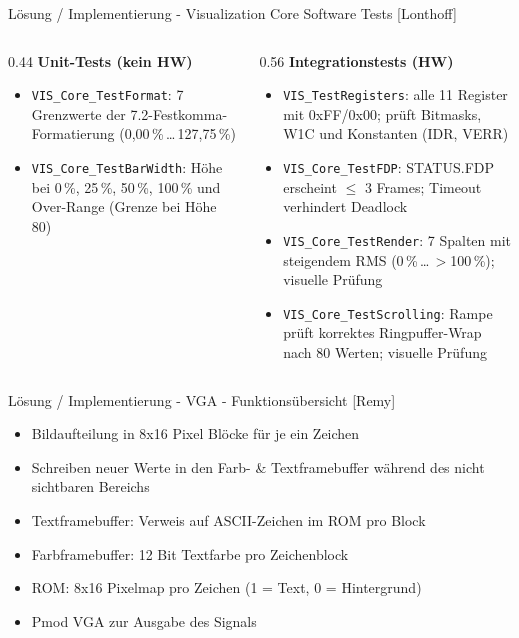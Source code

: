 \begin{frame}{Lösung / Implementierung - Visualization Core Software Tests [Lonthoff]}
    \begin{columns}[T]
        \begin{column}{0.44\textwidth}
            \textbf{Unit-Tests (kein HW)}
            \begin{itemize}
                \item \texttt{VIS\_Core\_TestFormat}: 7 Grenzwerte der 7.2-Fest\-komma-Formatierung (0{,}00\,\%\,\dots\,127{,}75\,\%)
                \item \texttt{VIS\_Core\_TestBarWidth}: Höhe bei 0\,\%, 25\,\%, 50\,\%, 100\,\% und Over-Range (Grenze bei Höhe 80)
            \end{itemize}
        \end{column}
        \begin{column}{0.56\textwidth}
            \textbf{Integrationstests (HW)}
            \begin{itemize}
                \item \texttt{VIS\_TestRegisters}: alle 11 Register mit 0xFF/0x00; prüft Bitmasks, W1C und Konstanten (IDR, VERR)
                \item \texttt{VIS\_Core\_TestFDP}: STATUS.FDP erscheint $\leq$ 3 Frames; Timeout verhindert Deadlock
                \item \texttt{VIS\_Core\_TestRender}: 7 Spalten mit steigendem RMS (0\,\%\,\dots\,$>$100\,\%); visuelle Prüfung
                \item \texttt{VIS\_Core\_TestScrolling}: Rampe prüft korrektes Ringpuffer-Wrap nach 80 Werten; visuelle Prüfung
            \end{itemize}
        \end{column}
    \end{columns}
\end{frame}
\begin{frame}{Lösung / Implementierung - VGA - Funktionsübersicht [Remy]}
    \begin{itemize}
        \item Bildaufteilung in 8x16 Pixel Blöcke für je ein Zeichen
        \item Schreiben neuer Werte in den Farb- \& Textframebuffer während des nicht sichtbaren Bereichs
        \item Textframebuffer: Verweis auf ASCII-Zeichen im ROM pro Block
        \item Farbframebuffer: 12 Bit Textfarbe pro Zeichenblock
        \item ROM: 8x16 Pixelmap pro Zeichen (1 = Text, 0 = Hintergrund)
        \item Pmod VGA zur Ausgabe des Signals
    \end{itemize}
\end{frame}
